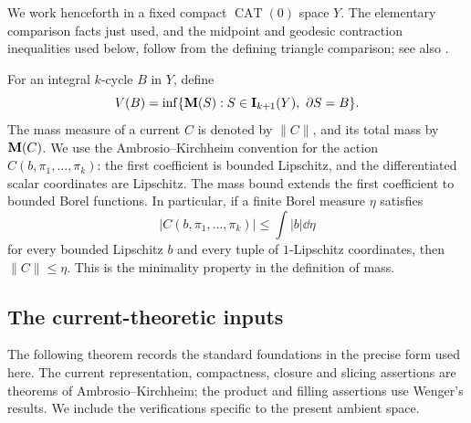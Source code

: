 We work henceforth in a fixed compact \(\operatorname{CAT}(0)\) space
\(Y\). The elementary comparison facts just used, and the midpoint and
geodesic contraction inequalities used below, follow from the defining
triangle comparison; see also \cite[Chapter~II.2]{BridsonHaefliger1999}.

For an integral \(k\)-cycle \(B\) in \(Y\), define
\begin{equation}
\label{eq:filling-volume-definition}
 V(B)=\inf\{\mathbf M(S):S\in\mathbf I_{k+1}(Y),\ \partial S=B\}.
\end{equation}
The mass measure of a current \(C\) is denoted by \(\|C\|\), and its total
mass by \(\mathbf M(C)\). We use the Ambrosio--Kirchheim convention for the action
\(C(b,\pi_1,\ldots,\pi_k)\): the first coefficient is bounded Lipschitz,
and the differentiated scalar coordinates are Lipschitz. The mass bound
extends the first coefficient to bounded Borel functions. In particular,
if a finite Borel measure \(\eta\) satisfies
\begin{equation}
\label{eq:mass-controlling-measure}
 |C(b,\pi_1,\ldots,\pi_k)|\le\int |b|\dd\eta
\end{equation}
for every bounded Lipschitz \(b\) and every tuple of \(1\)-Lipschitz
coordinates, then \(\|C\|\le\eta\). This is the minimality property in
the definition of mass.

\subsection{The current-theoretic inputs}

The following theorem records the standard foundations in the precise
form used here. The current representation, compactness, closure and
slicing assertions are theorems of Ambrosio--Kirchheim; the product and
filling assertions use Wenger's results. We include the verifications
specific to the present ambient space.

